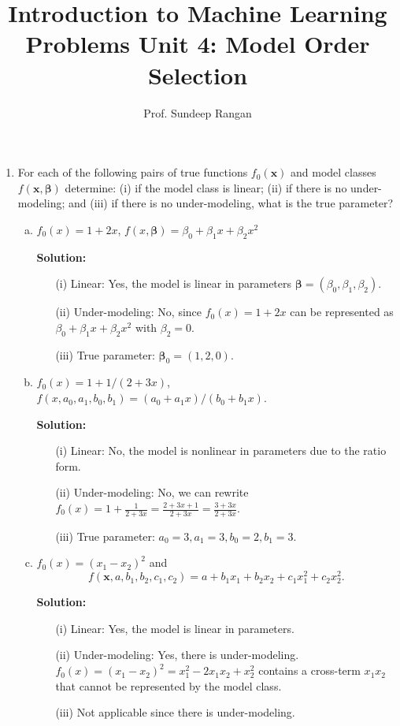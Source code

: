 \documentclass[11pt]{article}
\newcommand{\xbf}{\mathbf{x}}
\def\betabf{{\boldsymbol \beta}}
\begin{document}
\title{Introduction to Machine Learning\\
Problems Unit 4:  Model Order Selection}
\author{Prof. Sundeep Rangan}
\date{}

\maketitle

\begin{enumerate}

\item For each of the following pairs of true functions $f_0(\xbf)$ and model classes $f(\xbf,\betabf)$
determine: (i) if the model class is linear; (ii) if there is no under-modeling; and (iii) if there
is no under-modeling, what is the true parameter?
\begin{enumerate}[(a)]
  \item $f_0(x) = 1+2x$,  $f(x,\betabf) = \beta_0+\beta_1x+\beta_2x^2$
  
  \textbf{Solution:}
  \begin{itemize}
    \item[(i)] Linear: Yes, the model is linear in parameters $\betabf = (\beta_0, \beta_1, \beta_2)$.
    \item[(ii)] Under-modeling: No, since $f_0(x) = 1+2x$ can be represented as $\beta_0+\beta_1x+\beta_2x^2$ with $\beta_2 = 0$.
    \item[(iii)] True parameter: $\betabf_0 = (1, 2, 0)$.
  \end{itemize}
  
  \item $f_0(x) = 1 + 1/(2+3x)$, $f(x,a_0,a_1,b_0,b_1) = (a_0+a_1x)/(b_0+b_1 x)$.
  
  \textbf{Solution:}
  \begin{itemize}
    \item[(i)] Linear: No, the model is nonlinear in parameters due to the ratio form.
    \item[(ii)] Under-modeling: No, we can rewrite $f_0(x) = 1 + \frac{1}{2+3x} = \frac{2+3x+1}{2+3x} = \frac{3+3x}{2+3x}$.
    \item[(iii)] True parameter: $a_0 = 3, a_1 = 3, b_0 = 2, b_1 = 3$.
  \end{itemize}
  
  \item $f_0(x) = (x_1-x_2)^2$ and
\[
    f(\xbf,a,b_1,b_2,c_1,c_2) = a + b_1x_1 + b_2x_2 + c_{1}x_1^2 + c_{2}x_2^2.
\]

  \textbf{Solution:}
  \begin{itemize}
    \item[(i)] Linear: Yes, the model is linear in parameters.
    \item[(ii)] Under-modeling: Yes, there is under-modeling. $f_0(x) = (x_1-x_2)^2 = x_1^2 - 2x_1x_2 + x_2^2$ contains a cross-term $x_1x_2$ that cannot be represented by the model class.
    \item[(iii)] Not applicable since there is under-modeling.
  \end{itemize}
\end{enumerate}


\end{enumerate}
\end{document}
